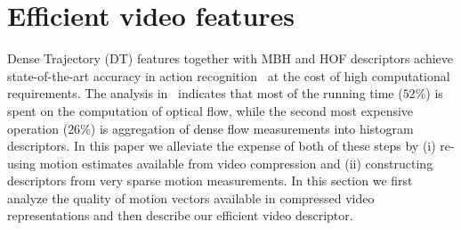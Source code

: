 \documentclass[10pt,twocolumn,letterpaper]{article}
\begin{document}
\section{Efficient video features}
\label{sec:features}

Dense Trajectory (DT) features together with MBH and HOF descriptors achieve state-of-the-art accuracy in action recognition~\cite{Wang12} at the cost of high computational requirements.
The analysis in~\cite{Wang12} indicates that most of the running time ($52\%$) is spent on the computation of optical flow, while the second most expensive operation ($26\%$) is aggregation of dense flow measurements into histogram descriptors. In this paper we alleviate the expense of both of these steps by (i) re-using motion estimates available from video compression and (ii) constructing descriptors from very sparse motion measurements. %
In this section we first analyze the quality of motion vectors available in compressed video representations and then describe our efficient video descriptor.


\end{document}
